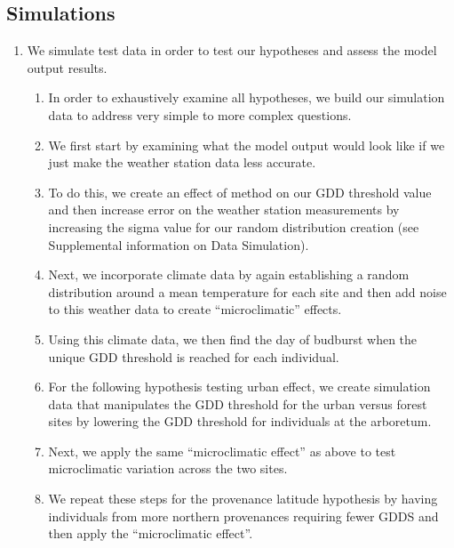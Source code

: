 \documentclass{article}\usepackage[]{graphicx}\usepackage[]{color}
\begin{document}
\subsection*{Simulations} %
\begin{enumerate}
\item We simulate test data in order to test our hypotheses and assess the model output results. 
  \begin{enumerate}
  \item In order to exhaustively examine all hypotheses, we build our simulation data to address very simple to more complex questions.
  \item We first start by examining what the model output would look like if we just make the weather station data less accurate.
  \item To do this, we create an effect of method on our GDD threshold value and then increase error on the weather station measurements by increasing the sigma value for our random distribution creation (see Supplemental information on Data Simulation). 
  \item Next, we incorporate climate data by again establishing a random distribution around a mean temperature for each site and then add noise to this weather data to create ``microclimatic'' effects. 
  \item Using this climate data, we then find the day of budburst when the unique GDD threshold is reached for each individual. 
  \item For the following hypothesis testing urban effect, we create simulation data that manipulates the GDD threshold for the urban versus forest sites by lowering the GDD threshold for individuals at the arboretum. 
  \item Next, we apply the same ``microclimatic effect'' as above to test microclimatic variation across the two sites. 
  \item We repeat these steps for the provenance latitude hypothesis by having individuals from more northern provenances requiring fewer GDDS and then apply the ``microclimatic effect''.
  \end{enumerate}
\end{enumerate}
\end{document}
